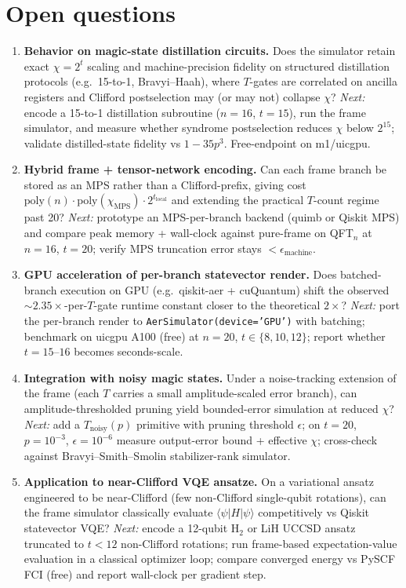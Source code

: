 \section{Open questions}

\begin{enumerate}
\item \textbf{Behavior on magic-state distillation circuits.} Does the simulator
retain exact $\chi = 2^t$ scaling and machine-precision fidelity on structured
distillation protocols (e.g.\ 15-to-1, Bravyi--Haah), where $T$-gates are
correlated on ancilla registers and Clifford postselection may (or may not)
collapse $\chi$?
\emph{Next:} encode a 15-to-1 distillation subroutine ($n=16$, $t=15$),
run the frame simulator, and measure whether syndrome postselection reduces
$\chi$ below $2^{15}$; validate distilled-state fidelity vs
$1 - 35 p^3$. Free-endpoint on m1/uicgpu.

\item \textbf{Hybrid frame + tensor-network encoding.} Can each frame branch
be stored as an MPS rather than a Clifford-prefix, giving cost
$\mathrm{poly}(n)\cdot\mathrm{poly}(\chi_{\text{MPS}})\cdot 2^{t_{\text{local}}}$
and extending the practical $T$-count regime past 20?
\emph{Next:} prototype an MPS-per-branch backend (quimb or Qiskit MPS)
and compare peak memory + wall-clock against pure-frame on QFT$_n$ at
$n=16$, $t=20$; verify MPS truncation error stays $<\epsilon_{\text{machine}}$.

\item \textbf{GPU acceleration of per-branch statevector render.} Does
batched-branch execution on GPU (e.g.\ qiskit-aer + cuQuantum) shift the
observed $\sim 2.35\times$-per-$T$-gate runtime constant closer to the
theoretical $2\times$?
\emph{Next:} port the per-branch render to \texttt{AerSimulator(device='GPU')}
with batching; benchmark on uicgpu A100 (free) at $n=20$, $t\in\{8,10,12\}$;
report whether $t=15\text{--}16$ becomes seconds-scale.

\item \textbf{Integration with noisy magic states.} Under a noise-tracking
extension of the frame (each $T$ carries a small amplitude-scaled error
branch), can amplitude-thresholded pruning yield bounded-error simulation
at reduced $\chi$?
\emph{Next:} add a $T_{\text{noisy}}(p)$ primitive with pruning threshold
$\epsilon$; on $t=20$, $p=10^{-3}$, $\epsilon=10^{-6}$ measure output-error
bound + effective $\chi$; cross-check against Bravyi--Smith--Smolin
stabilizer-rank simulator.

\item \textbf{Application to near-Clifford VQE ansatze.} On a variational
ansatz engineered to be near-Clifford (few non-Clifford single-qubit
rotations), can the frame simulator classically evaluate
$\langle\psi|H|\psi\rangle$ competitively vs Qiskit statevector VQE?
\emph{Next:} encode a 12-qubit H$_2$ or LiH UCCSD ansatz truncated to
$t<12$ non-Clifford rotations; run frame-based expectation-value evaluation
in a classical optimizer loop; compare converged energy vs PySCF FCI
(free) and report wall-clock per gradient step.
\end{enumerate}
